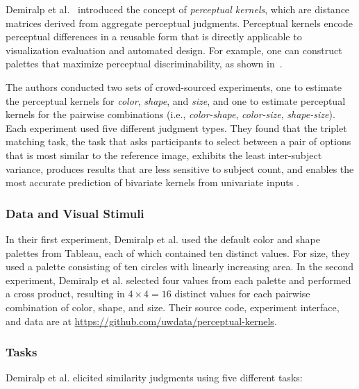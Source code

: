\documentclass[sigconf]{acmart}
\begin{document}
Demiralp et al.~\cite{demiralp2014learning} introduced the concept of \textit{perceptual kernels}, which are distance matrices derived from aggregate perceptual judgments. Perceptual kernels encode perceptual differences in a reusable form that is directly applicable to visualization evaluation and automated design. For example, one can construct palettes that maximize perceptual discriminability, as shown in~. 

The authors conducted two sets of crowd-sourced experiments, one to estimate the perceptual kernels for \textit{color}, \textit{shape}, and \textit{size}, and one to estimate perceptual kernels for the pairwise combinations (i.e., \textit{color-shape}, \textit{color-size}, \textit{shape-size}). Each experiment used five different judgment types. They found that the triplet matching task, the task that asks participants to select between a pair of options that is most similar to the reference image, exhibits the least inter-subject variance, produces results that are less sensitive to subject count, and enables the most accurate prediction of bivariate kernels from univariate inputs \cite{demiralp2014learning}.  
\subsubsection{Data and Visual Stimuli} 
In their first experiment, Demiralp et al. \cite{demiralp2014learning} used the default color and shape palettes from Tableau, each of which contained ten distinct values. For size, they used a palette consisting of ten circles with linearly increasing area. In the second experiment, Demiralp et al. \cite{demiralp2014learning} selected four values from each palette and performed a cross product, resulting in $4 \times 4 = 16$ distinct values for each pairwise combination of color, shape, and size. Their source code, experiment interface, and data are at \url{https://github.com/uwdata/perceptual-kernels}.  

\subsubsection{Tasks}
Demiralp et al. elicited similarity judgments using five different tasks:
\end{document}
